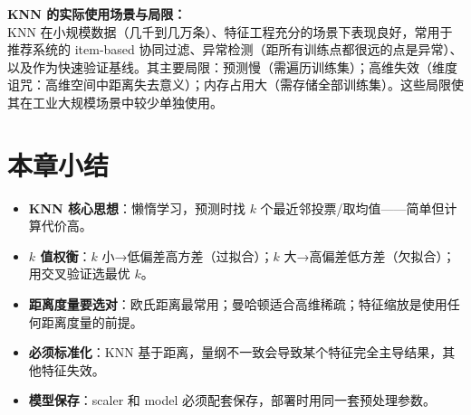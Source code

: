 \documentclass[a4paper,11pt]{ctexart}
\begin{document}
\begin{appbox}[现实应用场景]
    \textbf{KNN 的实际使用场景与局限：}\\
    KNN 在小规模数据（几千到几万条）、特征工程充分的场景下表现良好，常用于推荐系统的 item-based 协同过滤、异常检测（距所有训练点都很远的点是异常）、以及作为快速验证基线。其主要局限：预测慢（需遍历训练集）；高维失效（维度诅咒：高维空间中距离失去意义）；内存占用大（需存储全部训练集）。这些局限使其在工业大规模场景中较少单独使用。
\end{appbox}

\section{本章小结}
\begin{itemize}
    \item \textbf{KNN 核心思想}：懒惰学习，预测时找 $k$ 个最近邻投票/取均值——简单但计算代价高。
    \item \textbf{$k$ 值权衡}：$k$ 小→低偏差高方差（过拟合）；$k$ 大→高偏差低方差（欠拟合）；用交叉验证选最优 $k$。
    \item \textbf{距离度量要选对}：欧氏距离最常用；曼哈顿适合高维稀疏；特征缩放是使用任何距离度量的前提。
    \item \textbf{必须标准化}：KNN 基于距离，量纲不一致会导致某个特征完全主导结果，其他特征失效。
    \item \textbf{模型保存}：scaler 和 model 必须配套保存，部署时用同一套预处理参数。
\end{itemize}
\end{document}
